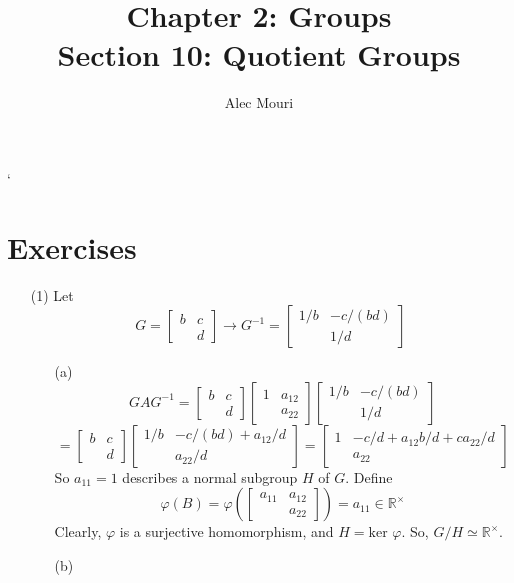 \documentclass[12pt]{article}
\begin{document}
\title{Chapter 2: Groups \\ Section 10: Quotient Groups}
\author{Alec Mouri}

\maketitle`
\section*{Exercises}
\begin{itemize}
\item[(1)]
Let
$$G = \begin{bmatrix}
b & c \\
& d
\end{bmatrix} \rightarrow G^{-1} = \begin{bmatrix}
1/b & -c/(bd) \\
& 1/d
\end{bmatrix}$$
\begin{itemize}
\item[(a)]
$$GAG^{-1} = \begin{bmatrix}
b & c \\
& d
\end{bmatrix}\begin{bmatrix}
1 & a_{12} \\
& a_{22}
\end{bmatrix}\begin{bmatrix}
1/b & -c/(bd) \\
& 1/d
\end{bmatrix}$$
$$= \begin{bmatrix}
b & c \\
& d
\end{bmatrix}\begin{bmatrix}
1/b & -c/(bd) + a_{12}/d \\
& a_{22}/d
\end{bmatrix} = \begin{bmatrix}
1 & -c/d + a_{12}b/d + ca_{22}/d \\
& a_{22}
\end{bmatrix}$$
So $a_{11} = 1$ describes a normal subgroup $H$ of $G$. Define
$$\varphi(B) = \varphi\left(\begin{bmatrix}
a_{11} & a_{12} \\
& a_{22}
\end{bmatrix}\right) = a_{11} \in \mathbb{R}^\times$$
Clearly, $\varphi$ is a surjective homomorphism, and $H = \text{ker }\varphi$. So, $G/H \simeq \mathbb{R}^\times$.
\item[(b)]

\end{itemize}
\end{itemize}
\end{document}
